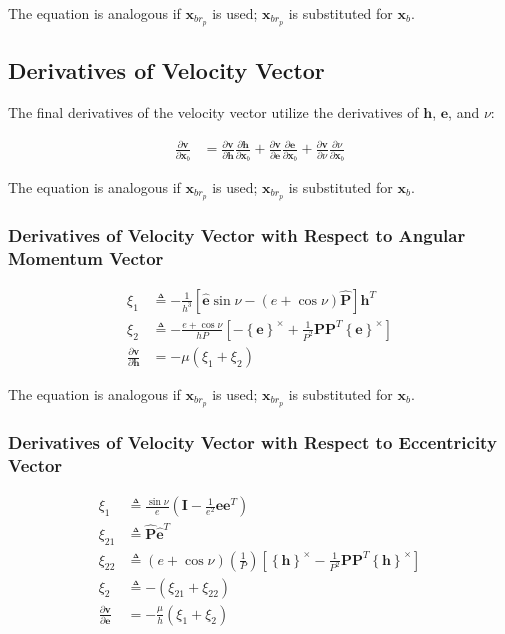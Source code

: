 \documentclass[]{article}
\newcommand{\vb}[1]{\bm{#1}} %
\newcommand{\vbh}[1]{\hat{\bm{#1}}} %
\newcommand{\pd}[2]{\frac{\partial #1}{\partial #2}} %
\newcommand{\crossmat}[1]{\left\{ {#1} \right\}^{\times}} %
\newcommand{\xb}[0]{\vb{x}_b}
\newcommand{\xbrp}[0]{\vb{x}_{br_p}}
\begin{document}
The equation is analogous if $\xbrp$ is used; $\xbrp$ is substituted for $\xb$.

\subsection{Derivatives of Velocity Vector}

The final derivatives of the velocity vector utilize the derivatives of $\vb{h}$, $\vb{e}$, and $\nu$:

\begin{align}
\pd{\vb{v}}{\xb} &= \pd{\vb{v}}{\vb{h}} \pd{\vb{h}}{\xb} + \pd{\vb{v}}{\vb{e}} \pd{\vb{e}}{\xb} + \pd{\vb{v}}{\nu} \pd{\nu}{\xb}
\end{align}

The equation is analogous if $\xbrp$ is used; $\xbrp$ is substituted for $\xb$.

\subsubsection{Derivatives of Velocity Vector with Respect to Angular Momentum Vector}

\begin{align}
\xi_1 &\triangleq -\frac{1}{h^3} \left[ \vbh{e} \sin{\nu} - \left( e + \cos{\nu} \right) \vbh{P} \right] \vb{h}^T \\
\xi_2 &\triangleq -\frac{e + \cos{\nu}}{h P} \left[ -\crossmat{\vb{e}} + \frac{1}{P^2} \vb{P} \vb{P}^T \crossmat{\vb{e}} \right] \\
\pd{\vb{v}}{\vb{h}} &= -\mu \left( \xi_1 + \xi_2 \right)
\end{align}

The equation is analogous if $\xbrp$ is used; $\xbrp$ is substituted for $\xb$.

\subsubsection{Derivatives of Velocity Vector with Respect to Eccentricity Vector}

\begin{align}
\xi_1 &\triangleq \frac{\sin{\nu}}{e} \left( \vb{I} - \frac{1}{e^2} \vb{e} \vb{e}^T \right) \\
\xi_{21} &\triangleq \vbh{P}\vbh{e}^T \\
\xi_{22} &\triangleq \left( e + \cos{\nu} \right) \left( \frac{1}{P} \right) \left[ \crossmat{\vb{h}} - \frac{1}{P^2} \vb{P} \vb{P}^T \crossmat{\vb{h}} \right]  \\
\xi_2 &\triangleq -\left( \xi_{21} + \xi_{22} \right) \\
\pd{\vb{v}}{\vb{e}} &= -\frac{\mu}{h} \left( \xi_1 + \xi_2 \right)
\end{align}
\end{document}
